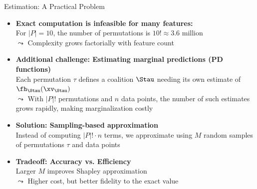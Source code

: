 \documentclass[11pt,compress,t,notes=noshow, aspectratio=169, xcolor=table]{beamer}
\begin{document}
\begin{frame}{Estimation: A Practical Problem}
\begin{itemize}[<+->]
  \item \textbf{Exact computation is infeasible for many features:}\\
        For $|P| = 10$, the number of permutations is $10! \approx 3.6$ million\\
        $\leadsto$ Complexity grows factorially with feature count

\item \textbf{Additional challenge: Estimating marginal predictions (PD functions)}\\
Each permutation $\tau$ defines a coalition $\Stau$ needing its own estimate of $\fh_{\Stau}(\xv_{\Stau})$\\
$\leadsto$ With $|P|!$ permutations and $n$ data points, the number of such estimates grows rapidly, making marginalization costly


  \item \textbf{Solution: Sampling-based approximation}\\
        Instead of computing $|P|! \cdot n$ terms, we approximate using $M$ random samples of permutations $\tau$ and data points

  \item \textbf{Tradeoff: Accuracy vs. Efficiency}\\
        Larger $M$ improves Shapley approximation\\
        $\leadsto$ Higher cost, but better fidelity to the exact value
\end{itemize}
\end{frame}


\newcommand{\xk}{\mathbf{x}^{(k)}}
\end{document}
